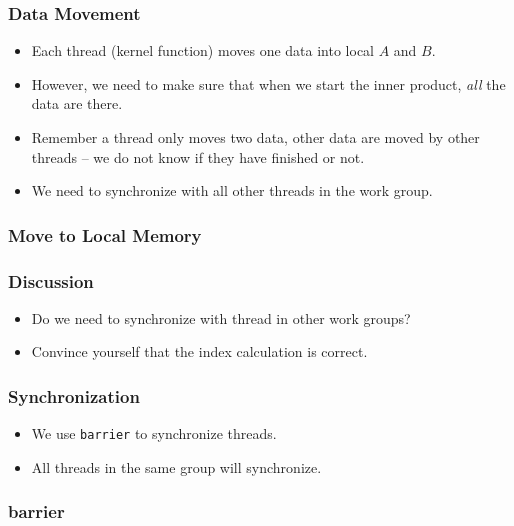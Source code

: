 \documentclass{beamer}
\begin{document}
\begin{frame}
\end{frame}

\begin{frame}
  \frametitle{Data Movement}
  \begin{itemize}
    \item Each thread (kernel function) moves one data into local $A$
      and $B$.
    \item However, we need to make sure that when we start the inner
      product, {\em all} the data are there.
    \item Remember a thread only moves two data, other data are moved
      by other threads -- we do not know if they have finished or not.
    \item We need to synchronize with all other threads in the work group.
  \end{itemize}
\end{frame}

\begin{frame}
\end{frame}

\begin{frame}
  \frametitle{Move to Local Memory}
  \centerline{}
\end{frame}


\begin{frame}
  \frametitle{Discussion}
  \begin{itemize}
    \item Do we need to synchronize with thread in other work groups?
    \item Convince yourself that the index calculation is correct.
  \end{itemize}
\end{frame}

\begin{frame}
  \frametitle{Synchronization}
  \begin{itemize}
    \item We use {\tt barrier} to synchronize threads.
    \item All threads in the same group will synchronize.
  \end{itemize}
\end{frame}

\begin{frame}
  \frametitle{barrier}
\end{frame}
\end{document}
